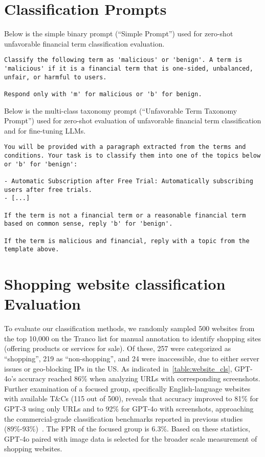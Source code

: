 \section{Classification Prompts}
\label{sec:prompts}
Below is the simple binary prompt (``Simple Prompt'') used for zero-shot unfavorable financial term classification evaluation.
\begin{lstlisting}[label=Simple Prompt]
Classify the following term as 'malicious' or 'benign'. A term is 'malicious' if it is a financial term that is one-sided, unbalanced, unfair, or harmful to users. 

Respond only with 'm' for malicious or 'b' for benign.
\end{lstlisting}


Below is the multi-class taxonomy prompt (``Unfavorable Term Taxonomy Prompt'') used for zero-shot evaluation of unfavorable financial term classification and for fine-tuning LLMs.
\begin{lstlisting}[label=Unfavorable Term Taxonomy Prompt]
You will be provided with a paragraph extracted from the terms and conditions. Your task is to classify them into one of the topics below or 'b' for 'benign':

- Automatic Subscription after Free Trial: Automatically subscribing users after free trials.
- [...]

If the term is not a financial term or a reasonable financial term based on common sense, reply 'b' for 'benign'.

If the term is malicious and financial, reply with a topic from the template above. 
\end{lstlisting}




\section{Shopping website classification Evaluation}
\label{sec:website_cls}



To evaluate our classification methods, we randomly sampled 500 websites from the top 10,000 on the Tranco list for manual annotation to identify shopping sites (offering products or services for sale). Of these, 257 were categorized as ``shopping'', 219 as ``non-shopping'', and 24 were inaccessible, due to either server issues or geo-blocking IPs in the US.
As indicated in~\autoref{table:website_cls}, GPT-4o's accuracy reached 86\% when analyzing URLs with corresponding screenshots. Further examination of a focused group, specifically English-language websites with available T\&Cs (115 out of 500), reveals that accuracy improved to 81\% for GPT-3 using only URLs and to 92\% for GPT-4o with screenshots, approaching the commercial-grade classification benchmarks reported in previous studies (89\%-93\%)~\citep{mathur2019dark}. The FPR of the focused group is 6.3\%. Based on these statistics, GPT-4o paired with image data is selected for the broader scale measurement of shopping websites.



